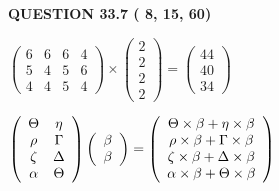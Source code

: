 \documentclass[12pt]{article}
\begin{document}
  
 
 
 
 
  
\vspace{0.2in}
  
{\textbf{\Large{QUESTION
33.7 
 (          8,         15,         60)
}}}
  
  
 
 
\noindent{}

 
$\left( \begin{array}{ccccccccccccccc}
           6 & 
           6 & 
           6 & 
           4 \\ 
           5 & 
           4 & 
           5 & 
           6 \\ 
           4 & 
           4 & 
           5 & 
           4
\end{array}\right) \times
\left( \begin{array}{c}
           2 \\ 
           2 \\ 
           2 \\ 
           2
\end{array}\right)  =
\left( \begin{array}{c}
          44 \\ 
          40 \\ 
          34
\end{array}\right)  $
 
$  %
 \left( \begin{array}
 {
 c
 c
 }
 \Theta & 
 \eta \\ 
 \rho & 
 \Gamma \\ 
                    \zeta & 
 \Delta \\ 
 \alpha & 
 \Theta
 \end{array} \right)
 \left( \begin{array}
 {
 c
 }
 \beta \\ 
 \beta
 \end{array} \right)
=
  \left( \begin{array}
 {
 c
 }
 \Theta \times  \beta   +  \eta \times  \beta \\ 
 \rho \times  \beta   +  \Gamma \times  \beta \\ 
                    \zeta \times  \beta   +  \Delta \times  \beta \\ 
 \alpha \times  \beta   +  \Theta \times  \beta
 \end{array} \right)
$
 
\end{document}
